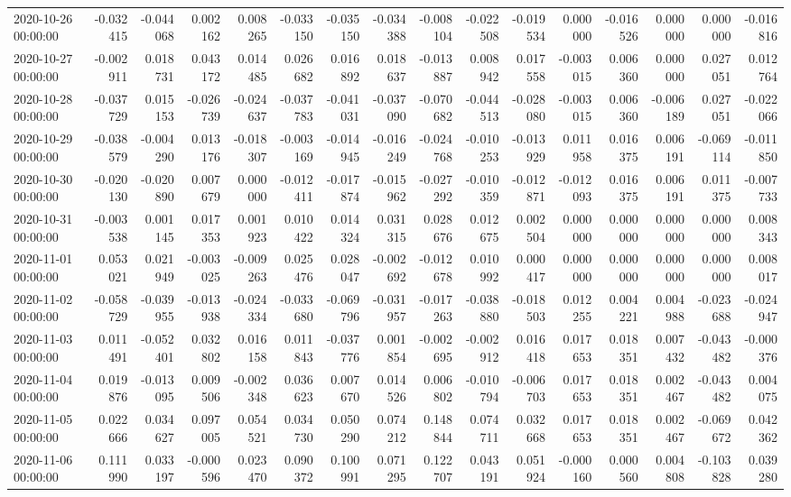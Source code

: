 \begin{tabular}{lrrrrrrrrrrrrrrr}
2020-10-26 00:00:00 & -0.032415 & -0.044068 & 0.002162 & 0.008265 & -0.033150 & -0.035150 & -0.034388 & -0.008104 & -0.022508 & -0.019534 & 0.000000 & -0.016526 & 0.000000 & 0.000000 & -0.016816 \\
2020-10-27 00:00:00 & -0.002911 & 0.018731 & 0.043172 & 0.014485 & 0.026682 & 0.016892 & 0.018637 & -0.013887 & 0.008942 & 0.017558 & -0.003015 & 0.006360 & 0.000000 & 0.027051 & 0.012764 \\
2020-10-28 00:00:00 & -0.037729 & 0.015153 & -0.026739 & -0.024637 & -0.037783 & -0.041031 & -0.037090 & -0.070682 & -0.044513 & -0.028080 & -0.003015 & 0.006360 & -0.006189 & 0.027051 & -0.022066 \\
2020-10-29 00:00:00 & -0.038579 & -0.004290 & 0.013176 & -0.018307 & -0.003169 & -0.014945 & -0.016249 & -0.024768 & -0.010253 & -0.013929 & 0.011958 & 0.016375 & 0.006191 & -0.069114 & -0.011850 \\
2020-10-30 00:00:00 & -0.020130 & -0.020890 & 0.007679 & 0.000000 & -0.012411 & -0.017874 & -0.015962 & -0.027292 & -0.010359 & -0.012871 & -0.012093 & 0.016375 & 0.006191 & 0.011375 & -0.007733 \\
2020-10-31 00:00:00 & -0.003538 & 0.001145 & 0.017353 & 0.001923 & 0.010422 & 0.014324 & 0.031315 & 0.028676 & 0.012675 & 0.002504 & 0.000000 & 0.000000 & 0.000000 & 0.000000 & 0.008343 \\
2020-11-01 00:00:00 & 0.053021 & 0.021949 & -0.003025 & -0.009263 & 0.025476 & 0.028047 & -0.002692 & -0.012678 & 0.010992 & 0.000417 & 0.000000 & 0.000000 & 0.000000 & 0.000000 & 0.008017 \\
2020-11-02 00:00:00 & -0.058729 & -0.039955 & -0.013938 & -0.024334 & -0.033680 & -0.069796 & -0.031957 & -0.017263 & -0.038880 & -0.018503 & 0.012255 & 0.004221 & 0.004988 & -0.023688 & -0.024947 \\
2020-11-03 00:00:00 & 0.011491 & -0.052401 & 0.032802 & 0.016158 & 0.011843 & -0.037776 & 0.001854 & -0.002695 & -0.002912 & 0.016418 & 0.017653 & 0.018351 & 0.007432 & -0.043482 & -0.000376 \\
2020-11-04 00:00:00 & 0.019876 & -0.013095 & 0.009506 & -0.002348 & 0.036623 & 0.007670 & 0.014526 & 0.006802 & -0.010794 & -0.006703 & 0.017653 & 0.018351 & 0.002467 & -0.043482 & 0.004075 \\
2020-11-05 00:00:00 & 0.022666 & 0.034627 & 0.097005 & 0.054521 & 0.034730 & 0.050290 & 0.074212 & 0.148844 & 0.074711 & 0.032668 & 0.017653 & 0.018351 & 0.002467 & -0.069672 & 0.042362 \\
2020-11-06 00:00:00 & 0.111990 & 0.033197 & -0.000596 & 0.023470 & 0.090372 & 0.100991 & 0.071295 & 0.122707 & 0.043191 & 0.051924 & -0.000160 & 0.000560 & 0.004808 & -0.103828 & 0.039280 \\

\end{tabular}

